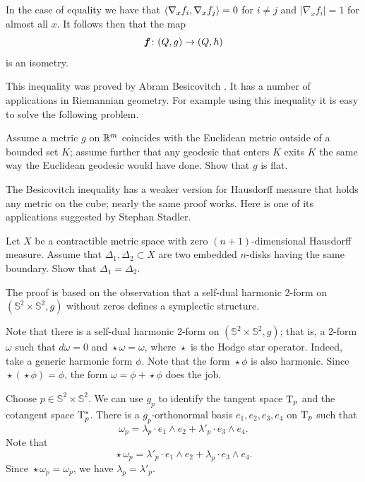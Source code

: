 In the case of equality we have that $\langle\nabla_x f_i,\nabla_x f_j\rangle=0$ for $i\ne j$ 
and $|\nabla_x f_i|=1$ for almost all $x$.
It follows then that the map 
\[\bm{f}\:(Q,g)\z\to (Q,h)\] 
is an isometry.
\qeds

This inequality was proved by Abram Besicovitch \cite{besicovitch}.
It has a number of applications in Riemannian geometry.
For example using this inequality it is easy to solve the following problem.

\begin{pr}
Assume a metric $g$ on $\mathbb{R}^m$ coincides with the Euclidean metric outside of a bounded set $K$;
assume further that any geodesic that enters $K$ exits $K$ the same way the Euclidean geodesic would have done. 
Show that $g$ is flat.
\end{pr}


The Besicovitch inequality has a weaker version for Hausdorff measure that holds any metric on the cube;
nearly the same proof works.
Here is one of its applications suggested by Stephan Stadler.

\begin{pr}
Let $X$ be a contractible metric space with zero $(n+1)$-dimensional Hausdorff measure.
Assume that $\Delta_1,\Delta_2\subset X$ are two embedded $n$-disks having the same boundary.
Show that $\Delta_1=\Delta_2$.
\end{pr}



The proof is based on the observation that a self-dual harmonic 2-form on $(\mathbb{S}^2\times\mathbb{S}^2,g)$
without zeros defines a symplectic structure.

\medskip

Note that there is a self-dual harmonic 2-form on $(\mathbb{S}^2\times\mathbb{S}^2,g)$;
that is, a 2-form $\omega$ such that $d\omega=0$ and $\mathop{\star}\omega=\omega$,
where $\mathop{\star}$ is the Hodge star operator.
Indeed, take a generic harmonic form $\phi$.
Note that the form $\mathop{\star}\phi$ is also harmonic.
Since $\mathop{\star}(\mathop{\star}\phi)=\phi$,
the form $\omega=\phi+\mathop{\star}\phi$ does the job.

Choose $p\in \mathbb{S}^2\times\mathbb{S}^2$.
We can use $g_p$ to identify the tangent space $\mathrm{T}_p$ and the cotangent space $\mathrm{T}^*_p$.
There is a $g_p$-orthonormal basis $e_1, e_2, e_3, e_4$ on $\mathrm{T}_p$ such that 
\[\omega_p=\lambda_p\cdot e_1\wedge e_2+\lambda'_p\cdot  e_3\wedge e_4.\]
Note that 
\[\mathop{\star}\omega_p=\lambda'_p\cdot e_1\wedge e_2+\lambda_p\cdot  e_3\wedge e_4.\]
Since $\mathop{\star}\omega_p=\omega_p$, we have $\lambda_p=\lambda'_p$.

